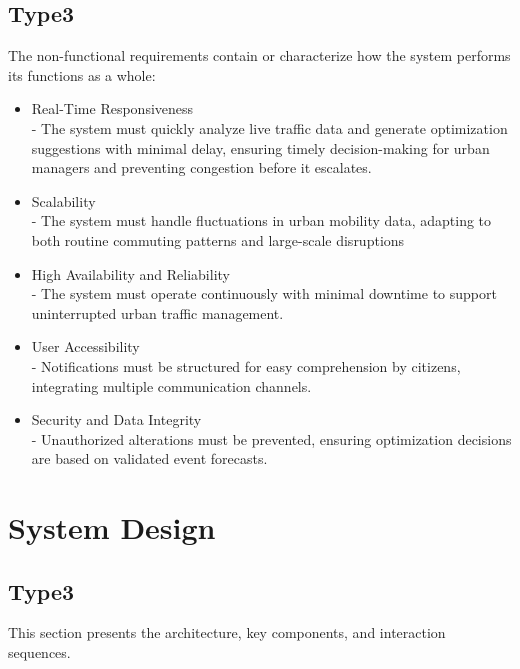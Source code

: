 \documentclass[a4paper,12pt]{article}
\begin{document}
\subsection*{Type3}
The non-functional requirements contain or characterize how the system performs its functions as a whole:
\begin{itemize}
    \item{Real-Time Responsiveness} 
    \\- The system must quickly analyze live traffic data and generate optimization suggestions with minimal delay, ensuring timely decision-making for urban managers and preventing congestion before it escalates.
    \item{Scalability} 
    \\- The system must handle fluctuations in urban mobility data, adapting to both routine commuting patterns and large-scale disruptions
    \item{High Availability and Reliability}
    \\- The system must operate continuously with minimal downtime to support uninterrupted urban traffic management.
    \item{User Accessibility} 
    \\- Notifications must be structured for easy comprehension by citizens, integrating multiple communication channels.
    \item{Security and Data Integrity} 
    \\- Unauthorized alterations must be prevented, ensuring optimization decisions are based on validated event forecasts.
\end{itemize}

\newpage

\section{System Design}


\subsection*{Type3}
This section presents the architecture, key components, and interaction sequences.
\end{document}
